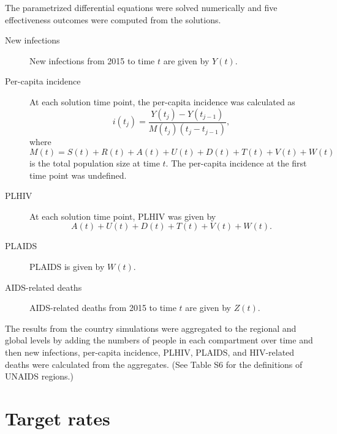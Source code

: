 \documentclass{article}
\begin{document}
The parametrized differential equations were solved numerically
\cite[see][]{medlock2016-git} and five effectiveness outcomes were
computed from the solutions.
\begin{description}
\item[New infections] New infections from 2015 to time $t$ are given
  by $Y(t)$.

\item[Per-capita incidence] At each solution time point, the
  per-capita incidence was calculated as
  \begin{equation}
    i(t_j) = \frac{Y(t_j) - Y(t_{j - 1})}{M(t_j) (t_j - t_{j - 1})},
  \end{equation}
  where
  \begin{equation}
    M(t) = S(t) + R(t) + A(t) + U(t) + D(t) + T(t) + V(t) + W(t)
  \end{equation}
  is the total population size at time $t$.  The per-capita incidence
  at the first time point was undefined.

\item[PLHIV] At each solution time point, PLHIV was given by
  \begin{equation}
    A(t) + U(t) + D(t) + T(t) + V(t) + W(t).
  \end{equation}

\item[PLAIDS] PLAIDS is given by $W(t)$.

\item[AIDS-related deaths] AIDS-related deaths from 2015 to time $t$
  are given by $Z(t)$.

\end{description}

The results from the country simulations were aggregated to the
regional and global levels by adding the numbers of people in each
compartment over time and then new infections, per-capita incidence,
PLHIV, PLAIDS, and HIV-related deaths were calculated from the
aggregates.  (See Table S6 for the definitions of UNAIDS regions.)


\section{Target rates}
\label{targets}
\end{document}
